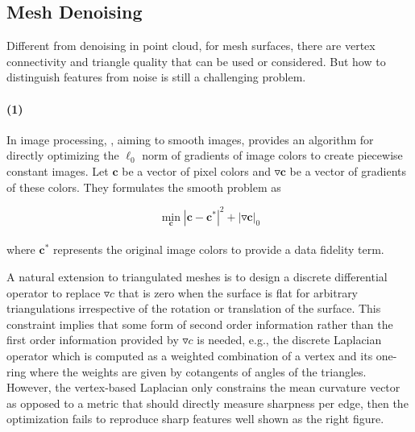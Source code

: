
\subsection{Mesh Denoising}
\label{subsec:L0 denoising}

Different from denoising in point cloud, for mesh surfaces, there are vertex connectivity and triangle quality that can be used or considered.
But how to distinguish features from noise is still a challenging problem. 

\paragraph{(1)}
In image processing, \cite{xu2011image}, aiming to smooth images, provides an algorithm for directly optimizing the $\ell_0$ norm of gradients of image colors to create piecewise constant images.
Let $\mathbf{c}$ be a vector of pixel colors and $\triangledown \mathbf{c}$ be a vector of gradients of these colors.
They formulates the smooth problem as

\small{
\begin{equation}
 \label{eq:imagesmooth}
 \min_{\mathbf{c}}|\mathbf{c}-\mathbf{c}^{*}|^2+|\triangledown \mathbf{c}|_0
\end{equation}
}
\\
where $\mathbf{c}^{*}$ represents the original image colors to provide a data fidelity term.

A natural extension to triangulated meshes is to design a discrete differential operator to replace $\triangledown c$ that is zero when the surface is flat for arbitrary triangulations irrespective of the rotation or translation of the surface.
This constraint implies that some form of second order information rather than the first order information provided by $\triangledown c$ is needed, e.g.,  the discrete Laplacian operator\cite{pinkall1993computing} which is computed as a weighted combination of a vertex and its one-ring where the weights are given by cotangents of angles of the triangles.
However,
the vertex-based Laplacian only constrains the mean curvature vector as opposed to a metric that should directly measure sharpness per edge, then the optimization fails to reproduce sharp features well shown as the right figure.

